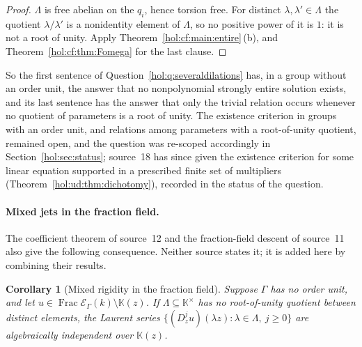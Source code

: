 \documentclass[11pt]{article}
\numberwithin{equation}{section}
\newtheorem{corollary}[theorem]{Corollary}
\theoremstyle{definition}
\theoremstyle{remark}
\newcommand{\KK}{\mathbb K}
\newcommand{\EK}{\mathcal E_\Gamma(k)}
\newcommand{\FE}{\operatorname{Frac}\EK}
\begin{document}
\begin{proof}
$\Lambda$ is free abelian on the $q_i$, hence torsion free. For distinct
$\lambda,\lambda'\in\Lambda$ the quotient $\lambda/\lambda'$ is a nonidentity
element of $\Lambda$, so no positive power of it is $1$: it is not a root of
unity. Apply Theorem~\ref{hol:cf:main:entire}\,(b), and
Theorem~\ref{hol:cf:thm:Fomega} for the last clause.
\end{proof}

So the first sentence of Question~\ref{hol:q:severaldilations} has, in a
group without an order unit, the answer that no nonpolynomial strongly
entire solution exists, and its last sentence has the answer that only the
trivial relation occurs whenever no quotient of parameters is a root of
unity. The existence criterion in groups with an order unit, and relations
among parameters with a root-of-unity quotient, remained open, and the
question was re-scoped accordingly in Section~\ref{hol:sec:status}; source~18
has since given the existence criterion for some linear equation supported in
a prescribed finite set of multipliers (Theorem~\ref{hol:ud:thm:dichotomy}),
recorded in the status of the question.

\paragraph{Mixed jets in the fraction field.}
The coefficient theorem of source~12 and the fraction-field descent of
source~11 also give the following consequence. Neither source states it;
it is added here by combining their results.

\begin{corollary}[Mixed rigidity in the fraction field]
\label{hol:cf:cor:meromorphicmixed}
Suppose $\Gamma$ has no order unit, and let $u\in\FE\setminus\KK(z)$.
If $\Lambda\subseteq\KK^\times$ has no root-of-unity quotient between
distinct elements, the Laurent series
$\{(D_z^ju)(\lambda z):\lambda\in\Lambda,\ j\ge0\}$ are algebraically
independent over $\KK(z)$.
\end{corollary}
\end{document}
